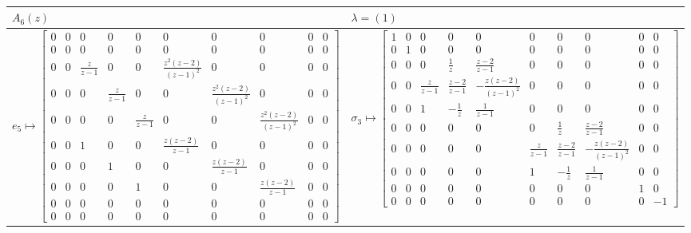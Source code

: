 \documentclass[11pt,a4paper,reqno,svgnames]{amsart}
\theoremstyle{plain}
\theoremstyle{definition}
\numberwithin{equation}{section}
\begin{document}
\begin{landscape}
\
\vfill
\begin{table}[hhh]
\centering
\begin{tabular}{ll}
 \toprule
 $A_{6}(z)$ & $\lambda=(1)$\\
 \midrule

$e_5\mapsto 
\begin{bmatrix}
0&0&0&0&0&0&0&0&0&0
\\
0&0&0&0&0&0&0&0&0&0\\
0&0&{\frac 
{z}{z-1}}&0&0&{\frac {{z}^{2} \left( z-2 \right) }{ \left( z-1
 \right) ^{2}}}&0&0&0&0\\
 0&0&0&{\frac {z}{z-1}}&0&0&
{\frac {{z}^{2} \left( z-2 \right) }{ \left( z-1 \right) ^{2}}}&0&0&0
\\
0&0&0&0&{\frac {z}{z-1}}&0&0&{\frac {{z}^{2}
 \left( z-2 \right) }{ \left( z-1 \right) ^{2}}}&0&0
\\
0&0&1&0&0&{\frac {z \left( z-2 \right) }{z-1}}&0&0
&0&0\\
0&0&0&1&0&0&{\frac {z \left( z-2 \right) }{z-1
}}&0&0&0\\
0&0&0&0&1&0&0&{\frac {z \left( z-2
 \right) }{z-1}}&0&0\\
0&0&0&0&0&0&0&0&0&0
\\
0&0&0&0&0&0&0&0&0&0 
\end{bmatrix}
$ 
&

$\sigma_3\mapsto \begin{bmatrix} 1&0&0&0&0&0&0&0&0&0
\\
0&1&0&0&0&0&0&0&0&0\\
0&0&0&\frac{1}{z}&{\frac {z-2}{z-1}}&0&0&0&0&0\\
0&0&{\frac {z}{z-1
}}&{\frac {z-2}{z-1}}&-{\frac {z \left( z-2 \right) }{ \left( z-1
 \right) ^{2}}}&0&0&0&0&0\\
 0&0&1&-\frac{1}{z}& \frac{1}{z
-1}&0&0&0&0&0\\
0&0&0&0&0&0&\frac{1}{z}&{
\frac {z-2}{z-1}}&0&0\\
0&0&0&0&0&{\frac {z}{z-1}}&{
\frac {z-2}{z-1}}&-{\frac {z \left( z-2 \right) }{ \left( z-1 \right) 
^{2}}}&0&0\\
0&0&0&0&0&1&-\frac{1}{z}& \frac{1}{z-1}&0&0\\
 0&0&0&0&0&0&0&0&1&0
\\
0&0&0&0&0&0&0&0&0&-1
\end{bmatrix}
$
\\
\bottomrule
\end{tabular}
\end{table}
\vfill 
\end{landscape}
\end{document}
